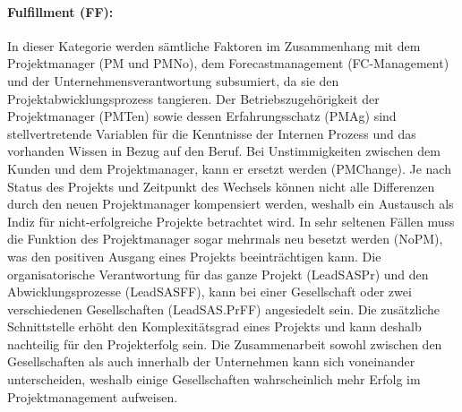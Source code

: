 \paragraph{Fulfillment (FF): } In dieser Kategorie werden sämtliche Faktoren im Zusammenhang mit dem Projektmanager (PM und PMNo), dem Forecastmanagement (FC-Management) und der Unternehmensverantwortung subsumiert, da sie den Projektabwicklungsprozess tangieren. Der Betriebszugehörigkeit der Projektmanager (PMTen) sowie dessen Erfahrungsschatz (PMAg) sind stellvertretende Variablen für die Kenntnisse der Internen Prozess und das vorhanden Wissen in Bezug auf den Beruf. Bei Unstimmigkeiten zwischen dem Kunden und dem Projektmanager, kann er ersetzt werden (PMChange). Je nach Status des Projekts und Zeitpunkt des Wechsels können nicht alle Differenzen durch den neuen Projektmanager kompensiert werden, weshalb ein Austausch als Indiz für nicht-erfolgreiche Projekte betrachtet wird. In sehr seltenen Fällen muss die Funktion des Projektmanager sogar mehrmals neu besetzt werden (NoPM), was den positiven Ausgang eines Projekts beeinträchtigen kann.
\newline Die organisatorische Verantwortung für das ganze Projekt (LeadSASPr) und den Abwicklungsprozesse (LeadSASFF), kann bei einer Gesellschaft oder zwei verschiedenen Gesellschaften (LeadSAS.PrFF) angesiedelt sein. Die zusätzliche Schnittstelle erhöht den Komplexitätsgrad eines Projekts und kann deshalb nachteilig für den Projekterfolg sein. Die Zusammenarbeit sowohl zwischen den Gesellschaften als auch innerhalb der Unternehmen kann sich voneinander unterscheiden, weshalb einige Gesellschaften wahrscheinlich mehr Erfolg im Projektmanagement aufweisen.
